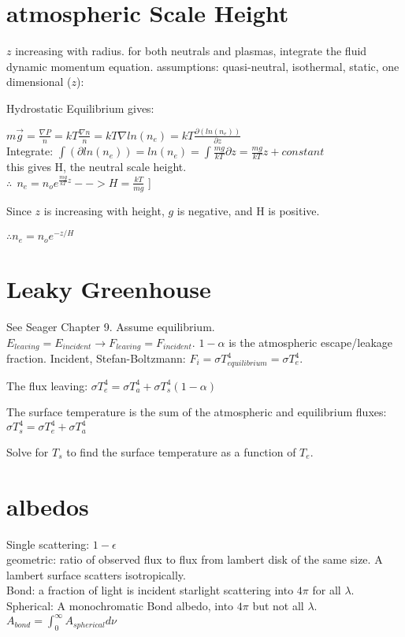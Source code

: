 \section{atmospheric Scale Height}

$z$ increasing with radius.
for both neutrals and plasmas, integrate the fluid dynamic momentum equation. assumptions: quasi-neutral, isothermal, static, one dimensional ($z$):

Hydrostatic Equilibrium  gives:

$ m\vec{g}= \frac{\nabla P}{n}  = kT\frac{\nabla n}{n}= k T \nabla ln(n_e)= kT \frac{\partial (ln(n_e))}{\partial z}$\\

Integrate: $\int (\partial ln(n_e))=ln(n_e)=\int \frac{mg}{ kT}\partial z = \frac{mg}{ kT}z+constant$\\
this gives H, the neutral scale height.\\ $\therefore \ \
 n_e=n_o e^{\frac{mg}{ kT}z} -->H=\frac{ k T}{mg}$ ]
 
 Since $z$ is increasing with height, $g$ is negative, and H is positive.
 
 \(\therefore  n_e=n_o e^{-z/H}\)

\section{Leaky Greenhouse}
See Seager Chapter 9.
Assume equilibrium. $E_{leaving}=E_{incident}\rightarrow F_{leaving}=F_{incident}$.
$1-\alpha$ is the atmospheric escape/leakage fraction.
Incident, Stefan-Boltzmann: $F_i=\sigma T_{equilibrium}^4=\sigma T_{e}^4$.

The flux leaving: $\sigma T_e^4 = \sigma T_a^4+\sigma T_s^4(1-\alpha)$

The surface temperature is the sum of the atmospheric and equilibrium fluxes: 
\(\sigma T_s^4 =\sigma T_e^4+\sigma T_a^4\)

Solve for $T_s$ to find the surface temperature as a function of $T_e$.

\section{albedos}
Single scattering: $1-\epsilon$\\
geometric: ratio of observed flux to flux from lambert disk of the same size. A lambert surface scatters isotropically.\\
Bond: a fraction of light is incident starlight scattering into $4\pi$ for all $\lambda.$
Spherical: A monochromatic Bond albedo, into $4\pi$ but not all $\lambda$.\\
\(A_{bond}=\int_0^\infty A_{spherical} d\nu \)

